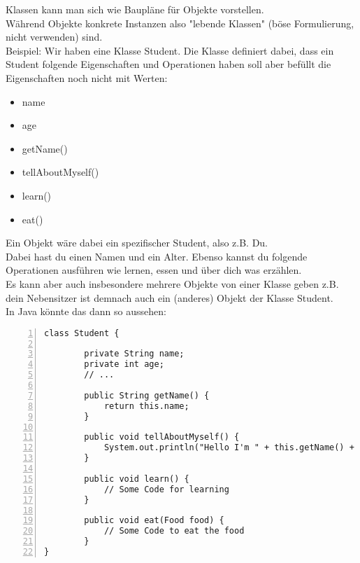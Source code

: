 


\begin{Infobox}
    Klassen kann man sich wie Baupläne für Objekte vorstellen.\\
    Während Objekte konkrete Instanzen also "lebende Klassen" (böse Formulierung, nicht verwenden) sind.\\

    Beispiel: Wir haben eine Klasse Student.
    Die Klasse definiert dabei, dass ein Student folgende Eigenschaften und Operationen haben soll aber befüllt die Eigenschaften noch nicht mit Werten:

    \begin{itemize}
        \item name
        \item age
        \item getName()
        \item tellAboutMyself()
        \item learn()
        \item eat()
    \end{itemize}

    Ein Objekt wäre dabei ein spezifischer Student, also z.B. Du.\\
    Dabei hast du einen Namen und ein Alter.
    Ebenso kannst du folgende Operationen ausführen wie lernen, essen und über dich was erzählen.\\
    Es kann aber auch insbesondere mehrere Objekte von einer Klasse geben z.B. dein Nebensitzer ist demnach auch ein (anderes) Objekt der Klasse Student.\\
    In Java könnte das dann so aussehen:

    \begin{lstlisting}[numbers=left,xleftmargin=2em,frame=single,framexleftmargin=1.5em]
class Student {

        private String name;
        private int age;
        // ...

        public String getName() {
            return this.name;
        }

        public void tellAboutMyself() {
            System.out.println("Hello I'm " + this.getName() + ". I'm " + age + " old!";
        }

        public void learn() {
            // Some Code for learning
        }

        public void eat(Food food) {
            // Some Code to eat the food
        }
}

    \end{lstlisting}
\end{Infobox}

